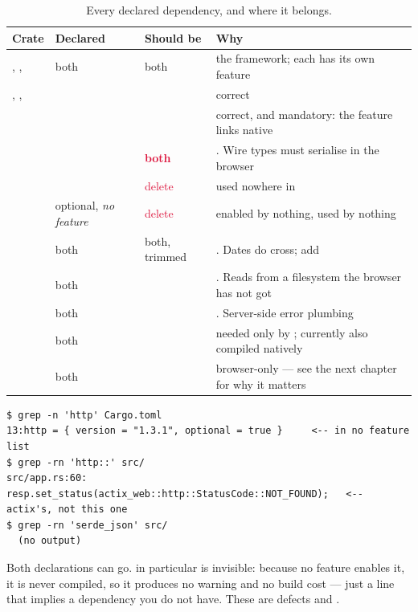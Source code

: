 \begin{table}[htbp]
\centering
\caption{Every declared dependency, and where it belongs.}
\label{tab:deps}
\small
\begin{tabular}{@{}L{0.20\textwidth}L{0.15\textwidth}L{0.15\textwidth}L{0.42\textwidth}@{}}
\toprule
\textbf{Crate} & \textbf{Declared} & \textbf{Should be} & \textbf{Why} \\
\midrule
{}, ,  & both & \textcolor{moss}{both} & the
framework; each has its own  feature \\
, ,  &  & \textcolor{moss}{} & correct \\
 &  & \textcolor{moss}{} & correct, and mandatory: the
 feature links native  \\
 & \textbf{} & \textcolor{crimson}{\textbf{both}} & . Wire types must
serialise in the browser \\
 &  & \textcolor{crimson}{delete} & used nowhere in  \\
 & optional, \emph{no feature} & \textcolor{crimson}{delete} & enabled by nothing,
used by nothing \\
 & both & \textcolor{amber}{both, trimmed} & . Dates do cross; add
 \\
 & both & \textcolor{crimson}{} & . Reads  from a
filesystem the browser has not got \\
 & both & \textcolor{crimson}{} & . Server-side error plumbing \\
 & both & \textcolor{amber}{} & needed only by
; currently also compiled natively \\
 & both & \textcolor{amber}{} & browser-only ---
see the next chapter for why it matters \\
\bottomrule
\end{tabular}
\end{table}

\begin{verified}
\begin{lstlisting}[style=out]
$ grep -n 'http' Cargo.toml
13:http = { version = "1.3.1", optional = true }     <-- in no feature list
$ grep -rn 'http::' src/
src/app.rs:60: resp.set_status(actix_web::http::StatusCode::NOT_FOUND);   <-- actix's, not this one
$ grep -rn 'serde_json' src/
  (no output)
\end{lstlisting}
Both declarations can go.  in particular is invisible: because no feature enables it,
it is never compiled, so it produces no warning and no build cost --- just a line that implies a
dependency you do not have. These are defects  and .
\end{verified}

